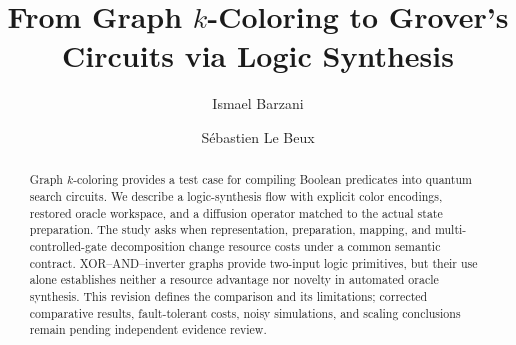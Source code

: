 \documentclass[sigconf, natbib]{acmart}
\begin{document}
\title{From Graph \texorpdfstring{$k$}{k}-Coloring to Grover's Circuits via Logic Synthesis}

%
\author{Ismael Barzani}

\author{Sébastien Le Beux}



\renewcommand{\shortauthors}{Barzani \& Le Beux}

\begin{abstract}
Graph $k$-coloring provides a test case for compiling Boolean predicates into quantum search circuits. We describe a logic-synthesis flow with explicit color encodings, restored oracle workspace, and a diffusion operator matched to the actual state preparation. The study asks when representation, preparation, mapping, and multi-controlled-gate decomposition change resource costs under a common semantic contract. XOR--AND--inverter graphs provide two-input logic primitives, but their use alone establishes neither a resource advantage nor novelty in automated oracle synthesis. This revision defines the comparison and its limitations; corrected comparative results, fault-tolerant costs, noisy simulations, and scaling conclusions remain pending independent evidence review.
\end{abstract}
\maketitle
\end{document}
